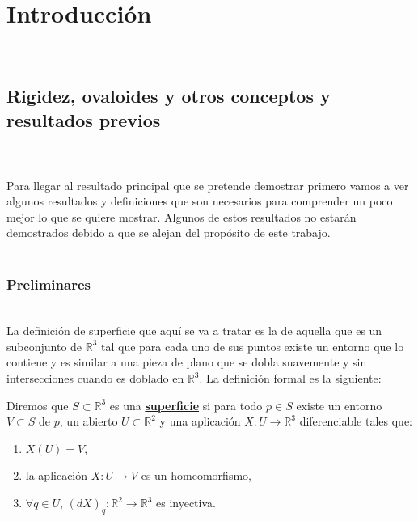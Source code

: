 \chapter{Introducción}


${ }$\\
\section{Rigidez, ovaloides y otros conceptos y resultados previos}
${ }$\\
${ }$\\


Para llegar al resultado principal que se pretende demostrar primero vamos a ver algunos resultados y definiciones que son necesarios para comprender un poco mejor lo que se quiere mostrar. Algunos de estos resultados no estarán demostrados debido a que se alejan del propósito de este trabajo.
${ }$\\



${ }$\\
\subsection{Preliminares}
${ }$\\


La definición de superficie que aquí se va a tratar es la de aquella que es un subconjunto de $\mathbb{R}^3$ tal que para cada uno de sus puntos existe un entorno que lo contiene y es similar a una pieza de plano que se dobla suavemente y sin intersecciones cuando es doblado en $\mathbb{R}^3$. La definición formal es la siguiente:
${ }$\\

\begin{definicion}
	Diremos que $S \subset \mathbb{R}^3$ es una \underline{\textbf{superficie}} si para todo $p \in S$ existe un entorno $V \subset S$ de $p$, un abierto $U \subset \mathbb{R}^2$ y una aplicación $X : U \to \mathbb{R}^3$ diferenciable tales que:
	\begin{enumerate}
		\item $X(U) = V$,
		\item la aplicación $X : U \to V$ es un homeomorfismo,
		\item $\forall q \in U$, $(dX)_q : \mathbb{R}^2 \to \mathbb{R}^3$ es inyectiva.
	\end{enumerate}
\end{definicion}
${ }$\\

